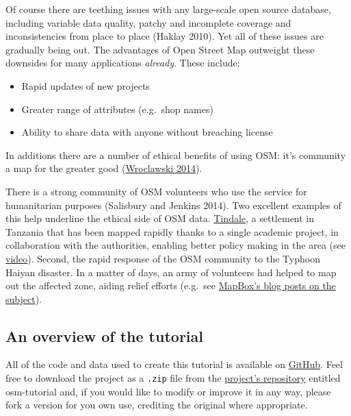 \documentclass[]{article}
\begin{document}
Of course there are teething issues with any large-scale open source
database, including variable data quality, patchy and incomplete
coverage and inconsistencies from place to place (Haklay 2010). Yet all
of these issues are gradually being out. The advantages of Open Street
Map outweight these downsides for many applications \emph{already}.
These include:

\begin{itemize}
\item
  Rapid updates of new projects
\item
  Greater range of attributes (e.g.~shop names)
\item
  Ability to share data with anyone without breaching license
\end{itemize}
In additions there are a number of ethical benefits of using OSM: it's
community a map for the greater good
(\href{http://www.theguardian.com/technology/2014/jan/14/why-the-world-needs-openstreetmap}{Wroclawski
2014}).

There is a strong community of OSM volunteers who use the service for
humanitarian purposes (Salisbury and Jenkins 2014). Two excellent
examples of this help underline the ethical side of OSM data.
\href{http://explore.ramanitanzania.org/}{Tindale}, a settlement in
Tanzania that has been mapped rapidly thanks to a single academic
project, in collaboration with the authorities, enabling better policy
making in the area (see
\href{http://www.youtube.com/watch?v=KqrGyvNnWkA}{video}). Second, the
rapid response of the OSM community to the Typhoon Haiyan disaster. In a
matter of days, an army of volunteers had helped to map out the affected
zone, aiding relief efforts (e.g.~see
\href{https://www.mapbox.com/blog/typhoon-haiyan-openstreetmap/}{MapBox's
blog posts on the subject}).

\subsection{An overview of the tutorial}

All of the code and data used to create this tutorial is available on
\href{http://github.com}{GitHub}. Feel free to download the project as a
\texttt{.zip} file from the
\href{https://github.com/Robinlovelace/osm-tutorial}{project's
repository} entitled osm-tutorial and, if you would like to modify or
improve it in any way, please fork a version for you own use, crediting
the original where appropriate.
\end{document}
